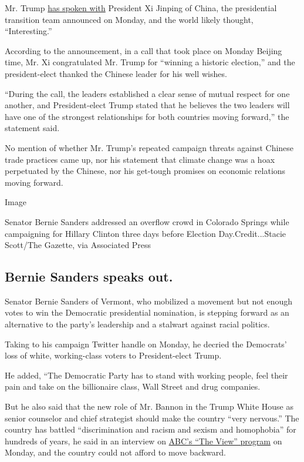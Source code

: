 Mr. Trump
\href{http://www.nytimes.com/2016/11/15/world/asia/trump-china-xi-jinping.html}{has
spoken with} President Xi Jinping of China, the presidential transition
team announced on Monday, and the world likely thought, ``Interesting.''

According to the announcement, in a call that took place on Monday
Beijing time, Mr. Xi congratulated Mr. Trump for ``winning a historic
election,'' and the president-elect thanked the Chinese leader for his
well wishes.

``During the call, the leaders established a clear sense of mutual
respect for one another, and President-elect Trump stated that he
believes the two leaders will have one of the strongest relationships
for both countries moving forward,'' the statement said.

No mention of whether Mr. Trump's repeated campaign threats against
Chinese trade practices came up, nor his statement that climate change
was a hoax perpetuated by the Chinese, nor his get-tough promises on
economic relations moving forward.

Image

Senator Bernie Sanders addressed an overflow crowd in Colorado Springs
while campaigning for Hillary Clinton three days before Election
Day.Credit...Stacie Scott/The Gazette, via Associated Press

\hypertarget{bernie-sanders-speaks-out}{%
\subsection{Bernie Sanders speaks
out.}\label{bernie-sanders-speaks-out}}

Senator Bernie Sanders of Vermont, who mobilized a movement but not
enough votes to win the Democratic presidential nomination, is stepping
forward as an alternative to the party's leadership and a stalwart
against racial politics.

Taking to his campaign Twitter handle on Monday, he decried the
Democrats' loss of white, working-class voters to President-elect Trump.

He added, ``The Democratic Party has to stand with working people, feel
their pain and take on the billionaire class, Wall Street and drug
companies.

But he also said that the new role of Mr. Bannon in the Trump White
House as senior counselor and chief strategist should make the country
``very nervous.'' The country has battled ``discrimination and racism
and sexism and homophobia'' for hundreds of years, he said in an
interview on
\href{https://twitter.com/ThisWeekABC/status/798203534445424641}{ABC's
``The View'' program} on Monday, and the country could not afford to
move backward.

